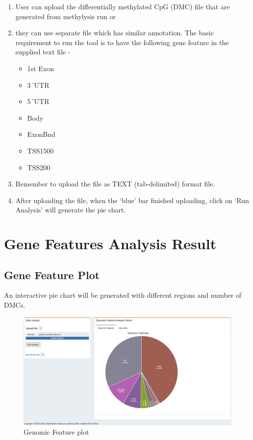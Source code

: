 \documentclass[
  a4paper,
  oneside,
  open=any]{scrreport}
\providecommand{\tightlist}{%
  \setlength{\itemsep}{0pt}\setlength{\parskip}{0pt}}\usepackage{longtable,booktabs,array}
\begin{document}
\begin{enumerate}
\def\labelenumi{\arabic{enumi}.}
\tightlist
\item
  User can upload the differentially methylated CpG (DMC) file that are
  generated from methylysis run or
\item
  they can use separate file which has similar annotation. The basic
  requirement to run the tool is to have the following gene feature in
  the supplied text file -

  \begin{itemize}
  \tightlist
  \item
    1st Exon
  \item
    3´UTR
  \item
    5´UTR
  \item
    Body
  \item
    ExonBnd
  \item
    TSS1500
  \item
    TSS200
  \end{itemize}
\item
  Remember to upload the file as TEXT (tab-delimited) format file.
\item
  After uploading the file, when the `blue' bar finished uploading,
  click on `Run Analysis' will generate the pie chart.
\end{enumerate}

\hypertarget{gene-features-analysis-result}{%
\section{Gene Features Analysis
Result}\label{gene-features-analysis-result}}

\hypertarget{gene-feature-plot}{%
\subsection{Gene Feature Plot}\label{gene-feature-plot}}

An interactive pie chart will be generated with different regions and
number of DMCs.\\

\begin{figure}[H]

{\centering \includegraphics{./_images/GeneFea1.png}

}

\caption{Genomic Feature plot}

\end{figure}
\end{document}
